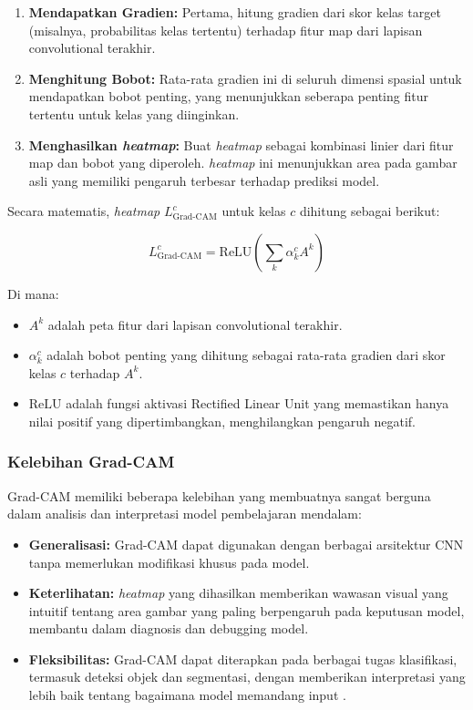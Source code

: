 \begin{enumerate}
    \item \textbf{Mendapatkan Gradien:} Pertama, hitung gradien dari skor kelas target (misalnya, probabilitas kelas tertentu) terhadap fitur map dari lapisan convolutional terakhir.
    \item \textbf{Menghitung Bobot:} Rata-rata gradien ini di seluruh dimensi spasial untuk mendapatkan bobot penting, yang menunjukkan seberapa penting fitur tertentu untuk kelas yang diinginkan.
    \item \textbf{Menghasilkan \emph{heatmap}:} Buat \emph{heatmap} sebagai kombinasi linier dari fitur map dan bobot yang diperoleh. \emph{heatmap} ini menunjukkan area pada gambar asli yang memiliki pengaruh terbesar terhadap prediksi model.
\end{enumerate}

Secara matematis, \emph{heatmap} \(L_{\text{Grad-CAM}}^c\) untuk kelas \(c\) dihitung sebagai berikut:

\[
L_{\text{Grad-CAM}}^c = \text{ReLU}\left(\sum_k \alpha_k^c A^k\right)
\]

Di mana:

\begin{itemize}
    \item \(A^k\) adalah peta fitur dari lapisan convolutional terakhir.
    \item \(\alpha_k^c\) adalah bobot penting yang dihitung sebagai rata-rata gradien dari skor kelas \(c\) terhadap \(A^k\).
    \item \(\text{ReLU}\) adalah fungsi aktivasi Rectified Linear Unit yang memastikan hanya nilai positif yang dipertimbangkan, menghilangkan pengaruh negatif.
\end{itemize}

\subsubsection{Kelebihan Grad-CAM}

Grad-CAM memiliki beberapa kelebihan yang membuatnya sangat berguna dalam analisis dan interpretasi model pembelajaran mendalam:

\begin{itemize}
    \item \textbf{Generalisasi:} Grad-CAM dapat digunakan dengan berbagai arsitektur CNN tanpa memerlukan modifikasi khusus pada model.
    \item \textbf{Keterlihatan:} \emph{heatmap} yang dihasilkan memberikan wawasan visual yang intuitif tentang area gambar yang paling berpengaruh pada keputusan model, membantu dalam diagnosis dan debugging model.
    \item \textbf{Fleksibilitas:} Grad-CAM dapat diterapkan pada berbagai tugas klasifikasi, termasuk deteksi objek dan segmentasi, dengan memberikan interpretasi yang lebih baik tentang bagaimana model memandang input \parencite{selvaraju2017grad}.
\end{itemize}

